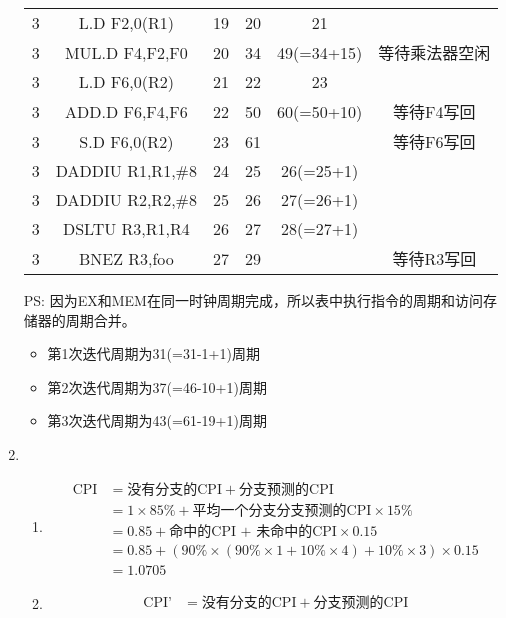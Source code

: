 \documentclass{article}
\begin{document}
\begin{enumerate}[label=\arabic*.]
\begin{table}[H]
\begin{tabular}{cccccc}
                3 & L.D F2,0(R1) & 19 & 20 & 21 & ~ \\
                3 & MUL.D F4,F2,F0 & 20 & 34 & 49(=34+15) & 等待乘法器空闲 \\
                3 & L.D F6,0(R2) & 21 & 22 & 23 & ~ \\
                3 & ADD.D F6,F4,F6 & 22 & 50 & 60(=50+10) & 等待F4写回 \\
                3 & S.D F6,0(R2) & 23 & 61 & ~ & 等待F6写回 \\
                3 & DADDIU R1,R1,\#8 & 24 & 25 & 26(=25+1) & ~ \\
                3 & DADDIU R2,R2,\#8 & 25 & 26 & 27(=26+1) & ~ \\
                3 & DSLTU R3,R1,R4 & 26 & 27 & 28(=27+1) & ~ \\
                3 & BNEZ R3,foo & 27 & 29 & ~ & 等待R3写回 \\
                \hline
            \end{tabular}
        \end{table}
        PS: 因为EX和MEM在同一时钟周期完成，所以表中执行指令的周期和访问存储器的周期合并。\\
        \begin{itemize}
            \item 第1次迭代周期为31(=31-1+1)周期
            \item 第2次迭代周期为37(=46-10+1)周期
            \item 第3次迭代周期为43(=61-19+1)周期
        \end{itemize}
        \item 
        \begin{enumerate}[label=(\arabic*)]
            \item 
            \begin{align*}
                \text{CPI} &= \text{没有分支的CPI}+\text{分支预测的CPI} \\
                &= 1 \times 85\% + \text{平均一个分支分支预测的CPI} \times 15\% \\
                &= 0.85 + \text{命中的CPI + 未命中的CPI} \times 0.15 \\
                &= 0.85 + (90\% \times (90\% \times 1 + 10\% \times 4) + 10\% \times 3) \times 0.15 \\
                &= 1.0705
            \end{align*}
            \item 
            \begin{align*}
                \text{CPI'} &= \text{没有分支的CPI}+\text{分支预测的CPI} \\

\end{align*}
\end{enumerate}
\end{enumerate}
\end{document}
